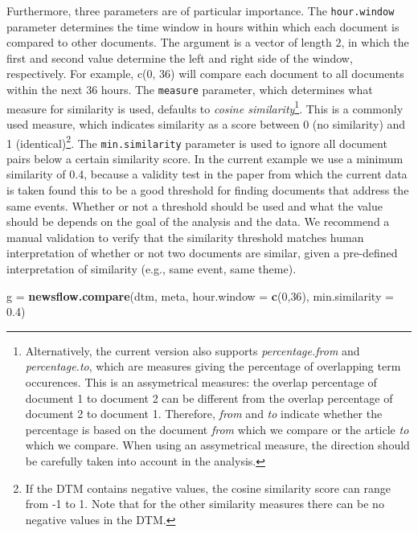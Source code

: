 \documentclass[]{article}
\newenvironment{Shaded}{\begin{snugshade}}{\end{snugshade}}
\newcommand{\KeywordTok}[1]{\textcolor[rgb]{0.13,0.29,0.53}{\textbf{{#1}}}}
\newcommand{\DataTypeTok}[1]{\textcolor[rgb]{0.13,0.29,0.53}{{#1}}}
\newcommand{\DecValTok}[1]{\textcolor[rgb]{0.00,0.00,0.81}{{#1}}}
\newcommand{\FloatTok}[1]{\textcolor[rgb]{0.00,0.00,0.81}{{#1}}}
\newcommand{\StringTok}[1]{\textcolor[rgb]{0.31,0.60,0.02}{{#1}}}
\newcommand{\NormalTok}[1]{{#1}}
\let\rmarkdownfootnote\footnote%
\def\footnote{\protect\rmarkdownfootnote}
\begin{document}
Furthermore, three parameters are of particular importance. The
\texttt{hour.window} parameter determines the time window in hours
within which each document is compared to other documents. The argument
is a vector of length 2, in which the first and second value determine
the left and right side of the window, respectively. For example, c(0,
36) will compare each document to all documents within the next 36
hours. The \texttt{measure} parameter, which determines what measure for
similarity is used, defaults to \emph{cosine similarity}\footnote{Alternatively,
  the current version also supports \emph{percentage.from} and
  \emph{percentage.to}, which are measures giving the percentage of
  overlapping term occurences. This is an assymetrical measures: the
  overlap percentage of document 1 to document 2 can be different from
  the overlap percentage of document 2 to document 1. Therefore,
  \emph{from} and \emph{to} indicate whether the percentage is based on
  the document \emph{from} which we compare or the article \emph{to}
  which we compare. When using an assymetrical measure, the direction
  should be carefully taken into account in the analysis.}. This is a
commonly used measure, which indicates similarity as a score between 0
(no similarity) and 1 (identical)\footnote{If the DTM contains negative
  values, the cosine similarity score can range from -1 to 1. Note that
  for the other similarity measures there can be no negative values in
  the DTM.}. The \texttt{min.similarity} parameter is used to ignore all
document pairs below a certain similarity score. In the current example
we use a minimum similarity of 0.4, because a validity test in the paper
from which the current data is taken found this to be a good threshold
for finding documents that address the same events. Whether or not a
threshold should be used and what the value should be depends on the
goal of the analysis and the data. We recommend a manual validation to
verify that the similarity threshold matches human interpretation of
whether or not two documents are similar, given a pre-defined
interpretation of similarity (e.g., same event, same theme).

\begin{Shaded}
\begin{Highlighting}[]
\NormalTok{g =}\StringTok{ }\KeywordTok{newsflow.compare}\NormalTok{(dtm, meta,}
                             \DataTypeTok{hour.window =} \KeywordTok{c}\NormalTok{(}\DecValTok{0}\NormalTok{,}\DecValTok{36}\NormalTok{), }
                             \DataTypeTok{min.similarity =} \FloatTok{0.4}\NormalTok{)}
\end{Highlighting}
\end{Shaded}
\end{document}
